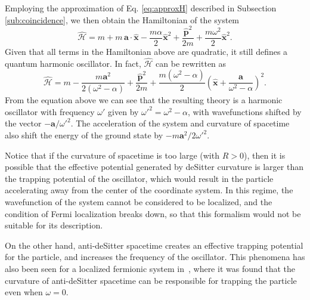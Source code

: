 \documentclass[prd,twocolumn,superscriptaddress,floatfix,amsmath,amssymb,amsfonts,longbibliography,nofootinbib]{revtex4-1}
\newcommand{\mf}{\mathsf}%
\begin{document}
Employing the approximation of Eq. \eqref{eq:approxH} described in Subsection \ref{sub:coincidence}, we then obtain the Hamiltonian of the system
\begin{equation}
    \hat{\mathcal{H}} = m + m\, \bm a \cdot \hat{\bm x} -\frac{m \alpha}{2} \hat{\bm x}^2 + \frac{\hat{\bm p}^2}{2m} + \frac{m\omega^2}{2}\hat{\bm x}^2.
\end{equation}
Given that all terms in the Hamiltonian above are quadratic, it still defines a quantum harmonic oscillator. In fact, $\hat{\mathcal{H}}$ can be rewritten as
\begin{equation}
    \hat{\mathcal{H}} = m -\frac{m \bm a^2}{2(\omega^2 - \alpha)}+ \frac{\hat{\bm p}^2}{2m} + \frac{m(\omega^2-\alpha)}{2}\left(\hat{\bm x}+\frac{\bm a}{\omega^2 - \alpha}\right)^2.
\end{equation}
From the equation above we can see that the resulting theory is a harmonic oscillator with frequency $\omega'$ given by $\omega'^2 = \omega^2 -\alpha$, with wavefunctions shifted by the vector $- \bm a /\omega'^2$. The acceleration of the system and curvature of spacetime also shift the energy of the ground state by $-m\bm a^2/2\omega'^2$.

Notice that if the curvature of spacetime is too large (with $R>0$), then it is possible that the effective potential generated by deSitter curvature is larger than the trapping potential of the oscillator, which would result in the particle accelerating away from the center of the coordinate system. In this regime, the wavefunction of the system cannot be considered to be localized, and the condition of Fermi localization breaks down, so that this formalism would not be suitable for its description. 

On the other hand, anti-deSitter spacetime creates an effective trapping potential for the particle, and increases the frequency of the oscillator. This phenomena has also been seen for a localized fermionic system in~\cite{jonas}, where it was found that the curvature of anti-deSitter spacetime can be responsible for trapping the particle even when $\omega = 0$.



\end{document}
